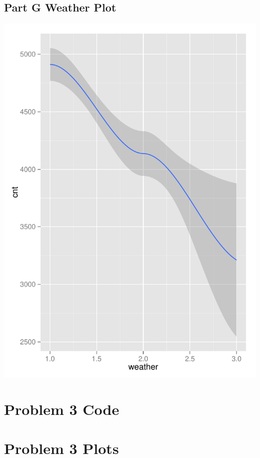 \documentclass[11pt]{article}
\begin{document}
\subsection{Part G Weather Plot}
\label{subsec:problem2gplotsWeather}
\includegraphics{Problem2G-Weather.pdf}
\pagebreak
\section{Problem 3 Code}
\label{sec:problem3code}

\pagebreak

\section{Problem 3 Plots}
\label{sec:problem3plots}
\end{document}
